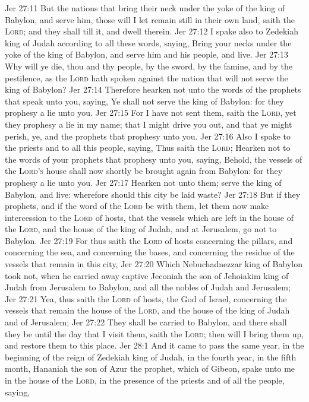 \vs Jer 27:11 But the nations that bring their neck under the yoke of the king of Babylon, and serve him, those will I let remain still in their own land, saith the \textsc{Lord}; and they shall till it, and dwell therein.
\vs Jer 27:12 I spake also to Zedekiah king of Judah according to all these words, saying, Bring your necks under the yoke of the king of Babylon, and serve him and his people, and live.
\vs Jer 27:13 Why will ye die, thou and thy people, by the sword, by the famine, and by the pestilence, as the \textsc{Lord} hath spoken against the nation that will not serve the king of Babylon?
\vs Jer 27:14 Therefore hearken not unto the words of the prophets that speak unto you, saying, Ye shall not serve the king of Babylon: for they prophesy a lie unto you.
\vs Jer 27:15 For I have not sent them, saith the \textsc{Lord}, yet they prophesy a lie in my name; that I might drive you out, and that ye might perish, ye, and the prophets that prophesy unto you.
\vs Jer 27:16 Also I spake to the priests and to all this people, saying, Thus saith the \textsc{Lord}; Hearken not to the words of your prophets that prophesy unto you, saying, Behold, the vessels of the \textsc{Lord's} house shall now shortly be brought again from Babylon: for they prophesy a lie unto you.
\vs Jer 27:17 Hearken not unto them; serve the king of Babylon, and live: wherefore should this city be laid waste?
\vs Jer 27:18 But if they  prophets, and if the word of the \textsc{Lord} be with them, let them now make intercession to the \textsc{Lord} of hosts, that the vessels which are left in the house of the \textsc{Lord}, and  the house of the king of Judah, and at Jerusalem, go not to Babylon.
\vs Jer 27:19 For thus saith the \textsc{Lord} of hosts concerning the pillars, and concerning the sea, and concerning the bases, and concerning the residue of the vessels that remain in this city,
\vs Jer 27:20 Which Nebuchadnezzar king of Babylon took not, when he carried away captive Jeconiah the son of Jehoiakim king of Judah from Jerusalem to Babylon, and all the nobles of Judah and Jerusalem;
\vs Jer 27:21 Yea, thus saith the \textsc{Lord} of hosts, the God of Israel, concerning the vessels that remain  the house of the \textsc{Lord}, and  the house of the king of Judah and of Jerusalem;
\vs Jer 27:22 They shall be carried to Babylon, and there shall they be until the day that I visit them, saith the \textsc{Lord}; then will I bring them up, and restore them to this place.
\vs Jer 28:1 And it came to pass the same year, in the beginning of the reign of Zedekiah king of Judah, in the fourth year,  in the fifth month,  Hananiah the son of Azur the prophet, which  of Gibeon, spake unto me in the house of the \textsc{Lord}, in the presence of the priests and of all the people, saying,
